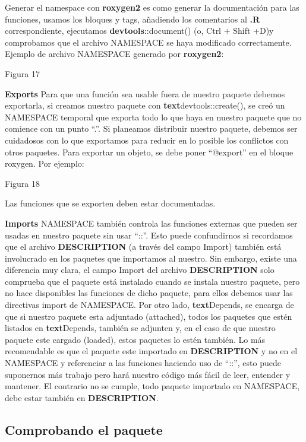 Generar el namespace con \textbf{roxygen2} es como generar la documentaci\'on para las funciones,
usamos los bloques y tags, a\~nadiendo los comentarios al \textbf{.R} correspondiente, ejecutamos
\textbf{devtools}::document() (o, Ctrl + Shift +D)y comprobamos que el archivo NAMESPACE se
haya modificado correctamente.
Ejemplo de archivo NAMESPACE generado por \textbf{roxygen2}:

Figura 17

\textbf{Exports}
Para que una funci\'on sea usable fuera de nuestro paquete debemos exportarla, si creamos
nuestro paquete con \textbf{text}{devtools::create()}, se cre\'o un NAMESPACE temporal que exporta todo
lo que haya en nuestro paquete que no comience con un punto “.”. Si planeamos distribuir
nuestro paquete, debemos ser cuidadosos con lo que exportamos para reducir en lo posible
los conflictos con otros paquetes.
Para exportar un objeto, se debe poner “@export” en el bloque roxygen. Por ejemplo:

Figura 18

Las funciones que se exporten deben estar documentadas.

\textbf{Imports}
NAMESPACE tambi\'en controla las funciones externas que pueden ser usadas en nuestro
paquete sin usar “::”. Esto puede confundirnos si recordamos que el archivo \textbf{DESCRIPTION}
(a trav\'es del campo Import) tambi\'en est\'a involucrado en los paquetes que importamos al
nuestro. Sin embargo, existe una diferencia muy clara, el campo Import del archivo
\textbf{DESCRIPTION} solo comprueba que el paquete est\'a instalado cuando se instala nuestro
paquete, pero no hace disponibles las funciones de dicho paquete, para ellos debemos usar
las directivas import de NAMESPACE.
Por otro lado, \textbf{text}{Depends}, se encarga de que si nuestro paquete esta adjuntado (attached),
todos los paquetes que est\'en listados en \textbf{text}{Depends}, tambi\'en se adjunten y, en el caso de que
nuestro paquete este cargado (loaded), estos paquetes lo est\'en tambi\'en.
Lo m\'as recomendable es que el paquete este importado en \textbf{DESCRIPTION} y no en el
NAMESPACE y referenciar a las funciones haciendo uso de “::”, esto puede suponernos m\'as
trabajo pero har\'a nuestro c\'odigo m\'as f\'acil de leer, entender y mantener. El contrario no se
cumple, todo paquete importado en NAMESPACE, debe estar tambi\'en en \textbf{DESCRIPTION}.

\subsection{Comprobando el paquete}

